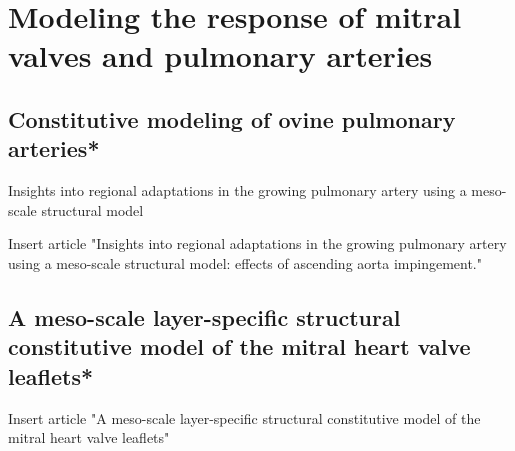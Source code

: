 \chapter{Modeling the response of mitral valves and pulmonary arteries}

\section{Constitutive modeling of ovine pulmonary arteries*}
Insights into regional adaptations in the growing pulmonary artery using a meso-scale structural model

Insert article "Insights into regional adaptations in the growing pulmonary artery using a meso-scale structural model: effects of ascending aorta impingement."

\section{A meso-scale layer-specific structural constitutive model of the mitral heart valve leaflets*}

Insert article "A meso-scale layer-specific structural constitutive model of the mitral heart valve leaflets"

